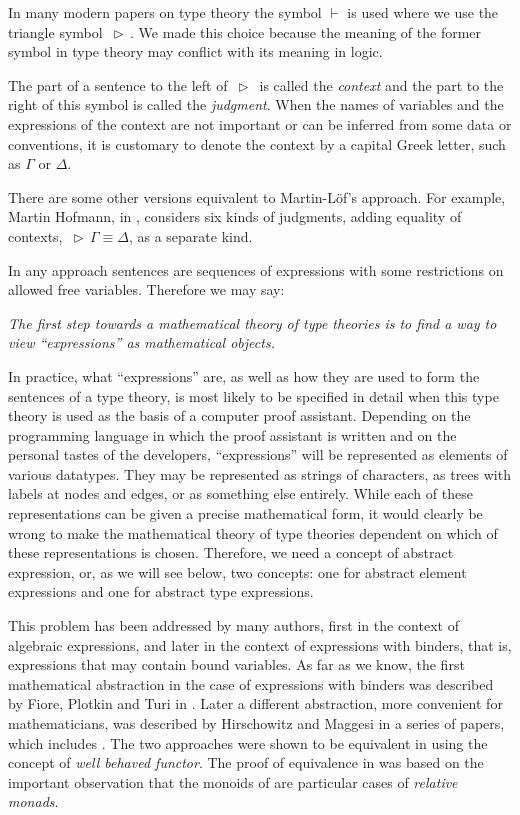 \documentclass[onecolumn,12pt]{amsart}
\numberwithin{proposition}{subsection}
\DeclareMathOperator{\rh}{\,\rhd\,}
\begin{document}
In many modern papers on type theory the symbol $\vdash$ is used where we use
the triangle symbol $\rh$. We made this choice because the meaning of the
former symbol in type theory may conflict with its meaning in logic.

The part of a sentence to the left of $\rh$ is called the {\em context} and the part
to the right of this symbol is called the {\em judgment}. When the names of
variables and the expressions of the context are not important or can be
inferred from some data or conventions, it is customary to denote the context
by a capital Greek letter, such as $\Gamma$ or $\Delta$.

There are some other versions equivalent to Martin-L\"{o}f's approach. For
example, Martin Hofmann, in \cite{Hofmann}, considers six kinds of judgments,
adding equality of contexts, $\rh \Gamma\equiv\Delta$, as a separate kind.

In any approach sentences are sequences of expressions with some restrictions
on allowed free variables. Therefore we may say:

{\em The first step towards a mathematical theory of type theories is to find a
  way to view ``expressions'' as mathematical objects.}

In practice, what ``expressions'' are, as well as how they are used to form the sentences of a type theory,
is most likely to be specified in detail when this type theory is
used as the basis of a computer proof assistant. Depending on the programming
language in which the proof assistant is written and on the personal tastes of
the developers, ``expressions'' will be represented as elements of various
datatypes. They may be represented as strings of characters, as trees
with labels at nodes and edges, or as something else entirely.  While
each of these representations can be given a precise mathematical form, it would
clearly be wrong to make the mathematical theory of type theories dependent on
which of these representations is chosen.  Therefore, we need a concept of
abstract expression, or, as we will see below, two concepts: one for abstract
element expressions and one for abstract type expressions.

This problem has been addressed by many authors, first in the context of
algebraic expressions, and later in the context of expressions with binders,
that is, expressions that may contain bound variables. As far as we know, the
first mathematical abstraction in the case of expressions with binders was
described by Fiore, Plotkin and Turi in \cite{FPT}. Later a different abstraction,
more convenient for mathematicians, was described by Hirschowitz and
Maggesi in a series of papers, which includes \cite{HM2010}.  The two approaches were
shown to be equivalent in \cite{ACU,ACU2} using the concept of {\em well
behaved functor}.
The proof of equivalence in \cite{ACU,ACU2} was based on the important
observation that the monoids of \cite{FPT} are particular cases of {\em
  relative monads}.
\end{document}
